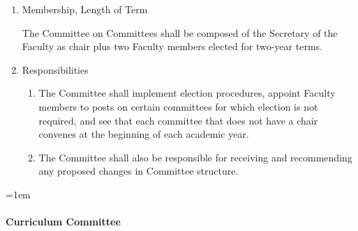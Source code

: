\documentclass{manual}
\let\oldparagraph\paragraph
\renewcommand\paragraph{\leftskip=1em\oldparagraph}
\newcommand{\itemLevelA}{\alph*.}
\newcommand{\itemLevelB}{\arabic*)}
\newcommand{\itemRefA}{\alph*}
\newcommand{\itemRefB}{\arabic*}
\begin{document}
				\begin{enumerate}[label=\itemLevelA,ref=\itemRefA]
				\item Membership, Length of Term

					The Committee on Committees shall be composed of the Secretary of the Faculty as chair plus two Faculty members elected for two-year terms.

				\item Responsibilities

					\begin{enumerate}[label=\itemLevelB,ref=\itemRefB]
					\item The Committee shall implement election procedures, appoint Faculty members to posts on certain committees for which election is not required, and see that each committee that does not have a chair convenes at the beginning of each academic year.
					\item The Committee shall also be responsible for receiving and recommending any proposed changes in Committee structure.
					\end{enumerate}
				
				\end{enumerate}

			\paragraph{Curriculum Committee}
\end{document}
